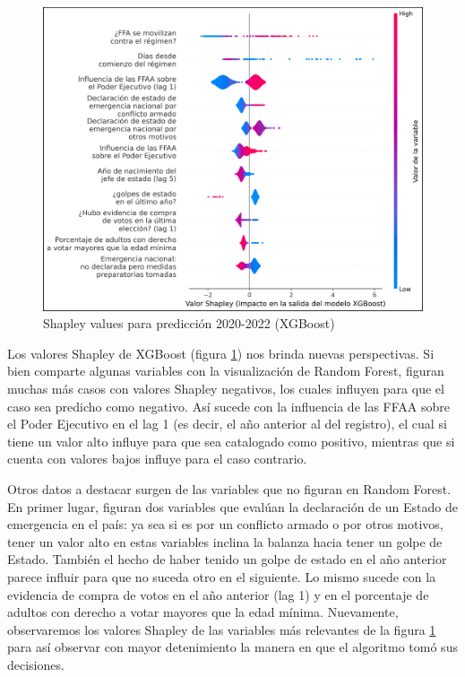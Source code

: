 \documentclass{article}
\begin{document}
\begin{figure}[H]
 \centering
 \includegraphics[width=1\textwidth]{10_shapley_values_xgb.png}
 \caption{Shapley values para predicción 2020-2022 (XGBoost)\label{fig:shapley_xgb}}
\end{figure}

Los valores Shapley de XGBoost (figura \ref{fig:shapley_xgb}) nos brinda nuevas perspectivas. 
Si bien comparte algunas variables con la visualización de Random Forest, figuran muchas más
casos con valores Shapley negativos, los cuales influyen para que el caso sea predicho como negativo. 
Así sucede con la influencia de las FFAA sobre el Poder Ejecutivo en el lag 1 (es decir, el año 
anterior al del registro), el cual si tiene un valor alto influye para que sea catalogado como 
positivo, mientras que si cuenta con valores bajos influye para el caso contrario.

Otros datos a destacar surgen de las variables que no figuran en Random Forest. En primer lugar,
figuran dos variables que evalúan la declaración de un Estado de emergencia en el país: ya sea si es 
por un conflicto armado o por otros motivos, tener un valor alto en estas variables inclina la balanza 
hacia tener un golpe de Estado. También el hecho de haber tenido un golpe de estado en el año anterior 
parece influir para que no suceda otro en el siguiente. Lo mismo sucede con la evidencia de compra de 
votos en el año anterior (lag 1) y en el porcentaje de adultos con derecho a votar mayores que la edad 
mínima. Nuevamente, observaremos los valores Shapley de las variables más relevantes de la figura
\ref{fig:shapley_xgb} para así observar con mayor detenimiento la manera en que el algoritmo tomó
sus decisiones.
\end{document}
